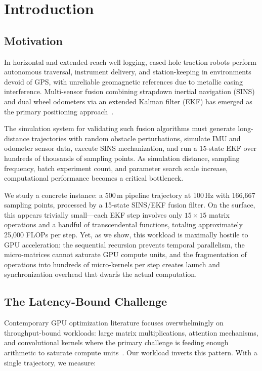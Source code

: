 \documentclass[pdflatex,sn-mathphys-num]{sn-jnl}%
\theoremstyle{thmstyleone}%
\theoremstyle{thmstyletwo}%
\theoremstyle{thmstylethree}%
\begin{document}
\section{Introduction}\label{sec1}

\subsection{Motivation}\label{subsec:motivation}

In horizontal and extended-reach well logging, cased-hole traction robots perform autonomous traversal, instrument delivery, and station-keeping in environments devoid of GPS, with unreliable geomagnetic references due to metallic casing interference. Multi-sensor fusion combining strapdown inertial navigation (SINS) and dual wheel odometers via an extended Kalman filter (EKF) has emerged as the primary positioning approach~\cite{bib1}.

The simulation system for validating such fusion algorithms must generate long-distance trajectories with random obstacle perturbations, simulate IMU and odometer sensor data, execute SINS mechanization, and run a 15-state EKF over hundreds of thousands of sampling points. As simulation distance, sampling frequency, batch experiment count, and parameter search scale increase, computational performance becomes a critical bottleneck.

We study a concrete instance: a 500\,m pipeline trajectory at 100\,Hz with 166,667 sampling points, processed by a 15-state SINS/EKF fusion filter. On the surface, this appears trivially small---each EKF step involves only $15\times15$ matrix operations and a handful of transcendental functions, totaling approximately 25,000 FLOPs per step. Yet, as we show, this workload is maximally hostile to GPU acceleration: the sequential recursion prevents temporal parallelism, the micro-matrices cannot saturate GPU compute units, and the fragmentation of operations into hundreds of micro-kernels per step creates launch and synchronization overhead that dwarfs the actual computation.

\subsection{The Latency-Bound Challenge}\label{subsec:challenge}

Contemporary GPU optimization literature focuses overwhelmingly on throughput-bound workloads: large matrix multiplications, attention mechanisms, and convolutional kernels where the primary challenge is feeding enough arithmetic to saturate compute units~\cite{bib2}. Our workload inverts this pattern. With a single trajectory, we measure:
\end{document}
